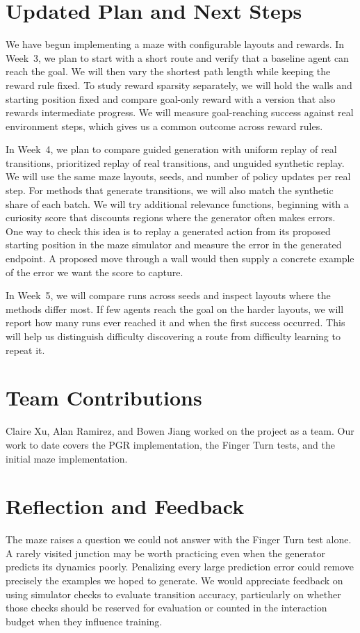 \documentclass[11pt,letterpaper]{cmu}
\begin{document}
\section{Updated Plan and Next Steps}
We have begun implementing a maze with configurable layouts and rewards. In Week~3, we plan to start with a short route and verify that a baseline agent can reach the goal. We will then vary the shortest path length while keeping the reward rule fixed. To study reward sparsity separately, we will hold the walls and starting position fixed and compare goal-only reward with a version that also rewards intermediate progress. We will measure goal-reaching success against real environment steps, which gives us a common outcome across reward rules.

In Week~4, we plan to compare guided generation with uniform replay of real transitions, prioritized replay of real transitions, and unguided synthetic replay. We will use the same maze layouts, seeds, and number of policy updates per real step. For methods that generate transitions, we will also match the synthetic share of each batch. We will try additional relevance functions, beginning with a curiosity score that discounts regions where the generator often makes errors. One way to check this idea is to replay a generated action from its proposed starting position in the maze simulator and measure the error in the generated endpoint. A proposed move through a wall would then supply a concrete example of the error we want the score to capture.

In Week~5, we will compare runs across seeds and inspect layouts where the methods differ most. If few agents reach the goal on the harder layouts, we will report how many runs ever reached it and when the first success occurred. This will help us distinguish difficulty discovering a route from difficulty learning to repeat it.

\section{Team Contributions}
Claire Xu, Alan Ramirez, and Bowen Jiang worked on the project as a team. Our work to date covers the PGR implementation, the Finger Turn tests, and the initial maze implementation.

\section{Reflection and Feedback}
The maze raises a question we could not answer with the Finger Turn test alone. A rarely visited junction may be worth practicing even when the generator predicts its dynamics poorly. Penalizing every large prediction error could remove precisely the examples we hoped to generate. We would appreciate feedback on using simulator checks to evaluate transition accuracy, particularly on whether those checks should be reserved for evaluation or counted in the interaction budget when they influence training.
\end{document}
